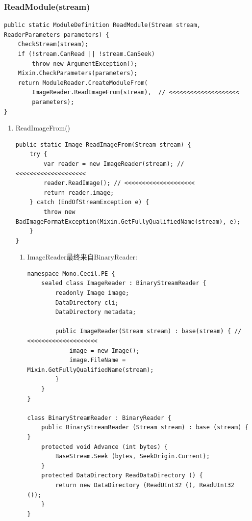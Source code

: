 \documentclass[9pt, b5paper]{article}
\begin{document}
\subsubsection{ReadModule(stream)}
\label{sec-9-1-3}
\begin{verbatim}
public static ModuleDefinition ReadModule(Stream stream, ReaderParameters parameters) {
    CheckStream(stream);
    if (!stream.CanRead || !stream.CanSeek)
        throw new ArgumentException();
    Mixin.CheckParameters(parameters);
    return ModuleReader.CreateModuleFrom(
        ImageReader.ReadImageFrom(stream),  // <<<<<<<<<<<<<<<<<<<< 
        parameters);
}
\end{verbatim}
\begin{enumerate}
\item ReadImageFrom()
\label{sec-9-1-3-1}
\begin{verbatim}
public static Image ReadImageFrom(Stream stream) {
    try {
        var reader = new ImageReader(stream); // <<<<<<<<<<<<<<<<<<<< 
        reader.ReadImage(); // <<<<<<<<<<<<<<<<<<<< 
        return reader.image;
    } catch (EndOfStreamException e) {
        throw new BadImageFormatException(Mixin.GetFullyQualifiedName(stream), e);
    }
}
\end{verbatim}
\begin{enumerate}
\item ImageReader最终来自BinaryReader:
\label{sec-9-1-3-1-1}
\begin{verbatim}
namespace Mono.Cecil.PE {
    sealed class ImageReader : BinaryStreamReader {
        readonly Image image;
        DataDirectory cli;
        DataDirectory metadata;
        
        public ImageReader(Stream stream) : base(stream) { // <<<<<<<<<<<<<<<<<<<< 
            image = new Image();
            image.FileName = Mixin.GetFullyQualifiedName(stream);
        }
    }
}

class BinaryStreamReader : BinaryReader {
    public BinaryStreamReader (Stream stream) : base (stream) { }
    protected void Advance (int bytes) {
        BaseStream.Seek (bytes, SeekOrigin.Current);
    }
    protected DataDirectory ReadDataDirectory () {
        return new DataDirectory (ReadUInt32 (), ReadUInt32 ());
    }
}


\end{verbatim}
\end{enumerate}
\end{enumerate}
\end{document}
